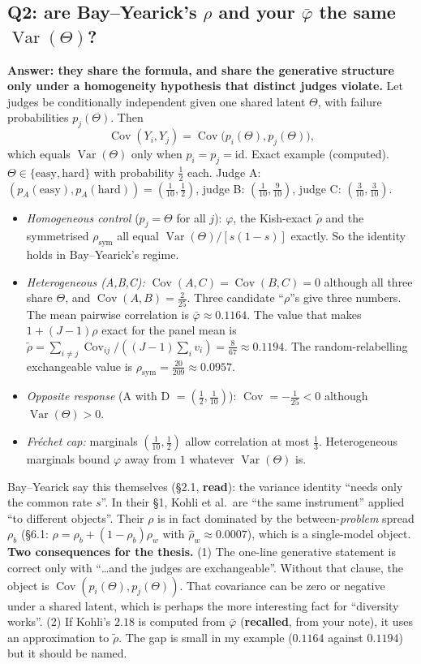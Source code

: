 \documentclass[11pt]{article}
\newcommand{\Var}{\operatorname{Var}}
\newcommand{\Cov}{\operatorname{Cov}}
\begin{document}
\subsection{Q2: are Bay--Yearick's $\rho$ and your $\bar\varphi$ the same $\Var(\Theta)$?}
\textbf{Answer: they share the formula, and share the generative structure only under a homogeneity hypothesis that distinct judges violate.} Let judges be conditionally independent given one shared latent $\Theta$, with failure probabilities $p_j(\Theta)$. Then
\[
\Cov(Y_i,Y_j)=\Cov\big(p_i(\Theta),p_j(\Theta)\big),
\]
which equals $\Var(\Theta)$ only when $p_i=p_j=\mathrm{id}$. Exact example (computed). $\Theta\in\{\text{easy},\text{hard}\}$ with probability $\tfrac12$ each. Judge A: $(p_A(\text{easy}),p_A(\text{hard}))=(\tfrac1{10},\tfrac12)$, judge B: $(\tfrac1{10},\tfrac9{10})$, judge C: $(\tfrac3{10},\tfrac3{10})$.
\begin{itemize}[nosep]
\item \emph{Homogeneous control} ($p_j=\Theta$ for all $j$): $\varphi$, the Kish-exact $\tilde\rho$ and the symmetrised $\rho_{\mathrm{sym}}$ all equal $\Var(\Theta)/[s(1-s)]$ exactly. So the identity holds in Bay--Yearick's regime.
\item \emph{Heterogeneous (A,B,C):} $\Cov(A,C)=\Cov(B,C)=0$ although all three share $\Theta$, and $\Cov(A,B)=\tfrac2{25}$. Three candidate ``$\rho$''s give three numbers. The mean pairwise correlation is $\bar\varphi\approx0.1164$. The value that makes $1+(J-1)\rho$ exact for the panel mean is $\tilde\rho=\sum_{i\ne j}\Cov_{ij}/((J-1)\sum_i v_i)=\tfrac8{67}\approx0.1194$. The random-relabelling exchangeable value is $\rho_{\mathrm{sym}}=\tfrac{20}{209}\approx0.0957$.
\item \emph{Opposite response} (A with D $=(\tfrac12,\tfrac1{10})$): $\Cov=-\tfrac1{25}<0$ although $\Var(\Theta)>0$.
\item \emph{Fr\'echet cap:} marginals $(\tfrac1{10},\tfrac12)$ allow correlation at most $\tfrac13$. Heterogeneous marginals bound $\varphi$ away from $1$ whatever $\Var(\Theta)$ is.
\end{itemize}
Bay--Yearick say this themselves (\S2.1, \textbf{read}): the variance identity ``needs only the common rate $s$''. In their \S1, Kohli et al.\ are ``the same instrument'' applied ``to different objects''. Their $\rho$ is in fact dominated by the between-\emph{problem} spread $\rho_b$ (\S6.1: $\rho=\rho_b+(1-\rho_b)\rho_w$ with $\hat\rho_w\approx0.0007$), which is a single-model object.
\textbf{Two consequences for the thesis.} (1) The one-line generative statement is correct only with ``\ldots and the judges are exchangeable''. Without that clause, the object is $\Cov(p_i(\Theta),p_j(\Theta))$. That covariance can be zero or negative under a shared latent, which is perhaps the more interesting fact for ``diversity works''. (2) If Kohli's $2.18$ is computed from $\bar\varphi$ (\textbf{recalled}, from your note), it uses an approximation to $\tilde\rho$. The gap is small in my example ($0.1164$ against $0.1194$) but it should be named.
\end{document}

